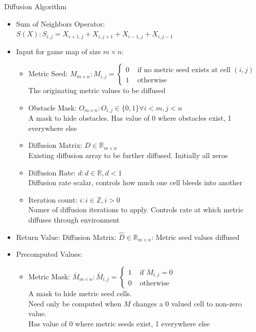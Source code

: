 \documentclass{beamer}
\begin{document}
\begin{frame}{Diffusion Algorithm}\fontsize{6pt}{7}\selectfont
  
  \begin{itemize}\fontsize{6pt}{7}\selectfont
  \item Sum of Neighbors Operator: \\$ S(X): S_{i,j} = X_{i+1,j} + X_{i,j+1} + X_{i-1,j} + X_{i,j-1} $
  \item Input for game map of size $m \times n$:
    \begin{itemize}\fontsize{6pt}{7}\selectfont
    \item Metric Seed: $M_{m \times n}: M_{i,j} = \left\{ \begin{array}{rl}
          0 &\mbox{ if no metric seed exists at cell }(i,j) \\
          1 &\mbox{ otherwise}
        \end{array} \right.$ \\ The originating metric values to be diffused
    \item Obstacle Mask: $O_{m \times n}: O_{i,j} \in \{0,1\} \forall i<m, j<n$ \\ A mask to hide obstacles.  Has value of 0 where obstacles exist, 1 everywhere else
    \item Diffusion Matrix: $D\in \mathbb{R}_{m \times n}$ \\ Existing diffusion array to be further diffused.  Initially all zeros
    \item Diffusion Rate: $d: d \in \mathbb{R},  d < 1$ \\ Diffusion rate scalar, controls how much one cell bleeds into another
    \item Iteration count: $i: i \in \mathbb{Z}, i > 0$ \\ Numer of diffusion iterations to apply.  Controls rate at which metric diffuses through environment
    \end{itemize}
  \item Return Value: Diffusion Matrix: $\hat D \in \mathbb{R}_{m \times n}$: Metric seed values diffused
  \item Precomputed Values:
    \begin{itemize}\fontsize{6pt}{7}\selectfont
	\item Metric Mask: $\bar M_{m \times n}: \bar M_{i,j} =  \left\{ \begin{array}{rl}
          1 &\mbox{ if $M_{i,j} = 0$} \\
          0 &\mbox{ otherwise}
        \end{array} \right.$ \\ A mask to hide metric seed cells.\\Need only be computed when $M$ changes a 0 valued cell to non-zero value.\\Has value of 0 where metric seeds exist, 1 everywhere else

\end{itemize}
\end{itemize}
\end{frame}
\end{document}
